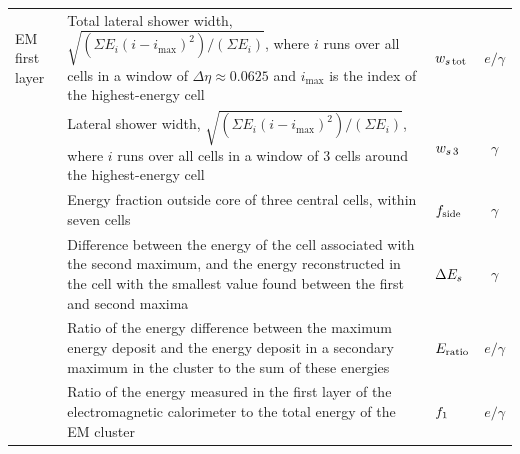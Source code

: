 \begin{table}[tp]
\begin{tabular}{
  l
  >{\RaggedRight}p{}
  lc}
  EM first layer
  & Total lateral shower width, $\sqrt{(\Sigma E_i
    (i-i_\mathrm{max})^2)/(\Sigma E_i)}$, where $i$ runs over all
    cells in a window of $\Delta\eta \approx 0.0625$ and
    $i_{\textrm{max}}$ is the index of the highest-energy cell
     & $w_{s\,\mathrm{tot}}$ & $e/\gamma$ \\
  & Lateral shower width,
    $\sqrt{(\Sigma E_i (i - i_{\textrm{max}})^2)/(\Sigma E_i)}$,
    where $i$ runs over all cells in a window of 3 cells around the
    highest-energy cell & $w_{s\,3}$ & $\gamma$ \\
  & Energy fraction outside core of three central cells, within seven cells   & $f_\mathrm{side}$ & $\gamma$ \\
  & Difference between the energy of the cell associated with the
    second maximum, and the energy reconstructed
    in the cell with the smallest value found between the first and
    second maxima  & $\Delta{}E_s$ & $\gamma$ \\
  & Ratio of the energy difference between the maximum energy deposit and the energy deposit in a secondary maximum in the cluster to the sum of these energies   & $E_\mathrm{ratio}$ & $e/\gamma$ \\
  & Ratio of the energy measured in the first layer of the electromagnetic calorimeter to the total energy of the
    EM cluster & $f_1$ & $e/\gamma$ \\


\end{tabular}
\end{table}

